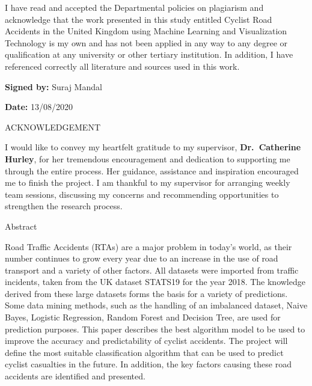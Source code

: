 \documentclass[
  a4paper,
]{article}
\begin{document}
\bigskip

I have read and accepted the Departmental policies on plagiarism and
acknowledge that the work presented in this study entitled Cyclist Road
Accidents in the United Kingdom using Machine Learning and Visualization
Technology is my own and has not been applied in any way to any degree
or qualification at any university or other tertiary institution. In
addition, I have referenced correctly all literature and sources used in
this work.

\textbf{Signed by: } Suraj Mandal

\textbf{Date: } 13/08/2020

\newpage

\begin{center}

\LARGE{ACKNOWLEDGEMENT}
 

\end{center}

I would like to convey my heartfelt gratitude to my supervisor,
\textbf{Dr.~Catherine Hurley}, for her tremendous encouragement and
dedication to supporting me through the entire process. Her guidance,
assistance and inspiration encouraged me to finish the project. I am
thankful to my supervisor for arranging weekly team sessions, discussing
my concerns and recommending opportunities to strengthen the research
process.

\newpage

\begin{center}

\large{Abstract}



\end{center}

\bigskip

Road Traffic Accidents (RTAs) are a major problem in today's world, as
their number continues to grow every year due to an increase in the use
of road transport and a variety of other factors. All datasets were
imported from traffic incidents, taken from the UK dataset STATS19 for
the year 2018. The knowledge derived from these large datasets forms the
basis for a variety of predictions. Some data mining methods, such as
the handling of an imbalanced dataset, Naive Bayes, Logistic Regression,
Random Forest and Decision Tree, are used for prediction purposes. This
paper describes the best algorithm model to be used to improve the
accuracy and predictability of cyclist accidents. The project will
define the most suitable classification algorithm that can be used to
predict cyclist casualties in the future. In addition, the key factors
causing these road accidents are identified and presented.
\end{document}
